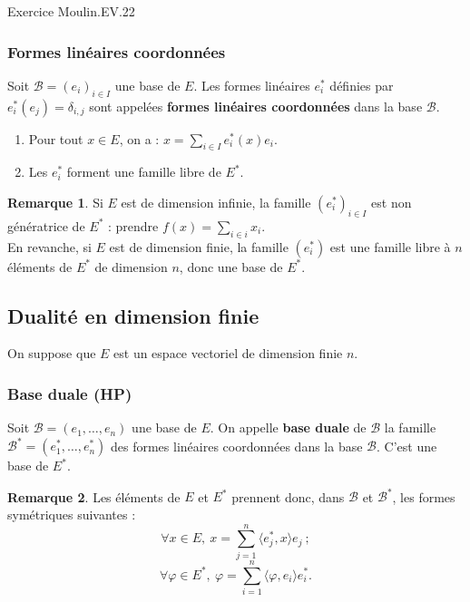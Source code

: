 \documentclass[french]{article}
\newcommand{\st}{^*}
\theoremstyle{plain}
\theoremstyle{definition}
\newtheorem*{rmq}{Remarque}
\theoremstyle{remark}
\begin{document}
Exercice Moulin.EV.22

\subsubsection*{Formes linéaires coordonnées}

\begin{dfn}
	Soit $\mathcal{B}=(e_i)_{i\in I}$ une base de $E$. Les formes linéaires $e_i\st$ définies par $e_i\st(e_j)=\delta_{i,j}$ sont appelées \textbf{formes linéaires coordonnées} dans la base $\mathcal{B}$.
\end{dfn}

\begin{prop}%
	\begin{enumerate}
		\item Pour tout $x\in E$, on a : $x=\displaystyle\sum_{i\in I}e_i\st(x)e_i$.
		\item Les $e_i\st$ forment une famille libre de $E\st$.
	\end{enumerate}
\end{prop}

\begin{rmq}
	Si $E$ est de dimension infinie, la famille $(e_i\st)_{i\in I}$ est non génératrice de $E\st$ : prendre $f(x)=\sum_{i\in i}x_i$. \\
	En revanche, si $E$ est de dimension finie, la famille $(e_i\st)$ est une famille libre à $n$ éléments de $E\st$ de dimension $n$, donc une base de $E\st$.
\end{rmq}

\subsection{Dualité en dimension finie}

On suppose que $E$ est un espace vectoriel de dimension finie $n$.

\subsubsection*{Base duale (HP)}

\begin{dfn}
	Soit $\mathcal{B}=(e_1,\ldots,e_n)$ une base de $E$. On appelle \textbf{base duale} de $\mathcal{B}$ la famille $\mathcal{B}\st=(e_1\st,\ldots,e_n\st)$ des formes linéaires coordonnées dans la base $\mathcal{B}$. C'est une base de $E\st$. 
\end{dfn}

\begin{rmq}
	Les éléments de $E$ et $E\st$ prennent donc, dans $\mathcal{B}$ et $\mathcal{B}\st$, les formes symétriques suivantes : $$\forall x\in E,\ x=\sum_{j=1}^{n}\langle e_j\st,x\rangle e_j\ ;$$ $$\forall \varphi\in E\st,\ \varphi=\sum_{i=1}^{n}\langle\varphi,e_i\rangle e_i\st.$$
\end{rmq}
\end{document}
